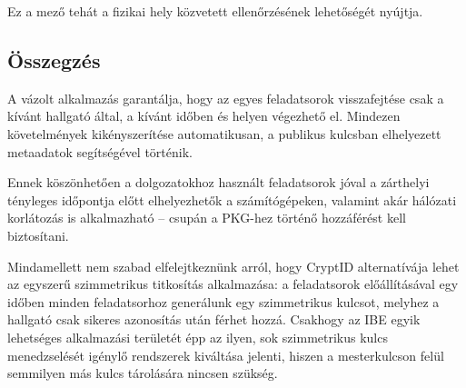 Ez a mező tehát a fizikai hely közvetett ellenőrzésének lehetőségét nyújtja.

\subsection{Összegzés}

A vázolt alkalmazás garantálja, hogy az egyes feladatsorok visszafejtése csak a kívánt hallgató által, a kívánt időben és helyen végezhető el. Mindezen követelmények kikényszerítése automatikusan, a publikus kulcsban elhelyezett metaadatok segítségével történik.

Ennek köszönhetően a dolgozatokhoz használt feladatsorok jóval a zárthelyi tényleges időpontja előtt elhelyezhetők a számítógépeken, valamint akár hálózati korlátozás is alkalmazható – csupán a PKG-hez történő hozzáférést kell biztosítani.

Mindamellett nem szabad elfelejtkeznünk arról, hogy CryptID alternatívája lehet az egyszerű szimmetrikus titkosítás alkalmazása: a feladatsorok előállításával egy időben minden feladatsorhoz generálunk egy szimmetrikus kulcsot, melyhez a hallgató csak sikeres azonosítás után férhet hozzá. Csakhogy az IBE egyik lehetséges alkalmazási területét épp az ilyen, sok szimmetrikus kulcs menedzselését igénylő rendszerek kiváltása jelenti, hiszen a mesterkulcson felül semmilyen más kulcs tárolására nincsen szükség.
